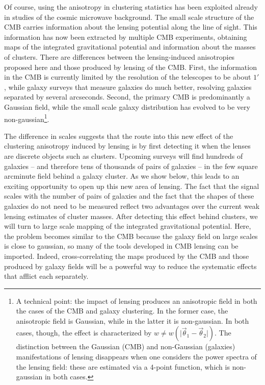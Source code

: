 Of course, using the anisotropy in clustering
statistics has been exploited already in studies of the cosmic
microwave background.  The small scale structure of the CMB carries
information about the lensing potential along the line of sight. This
information has now been extracted by multiple CMB experiments,
obtaining maps of the integrated gravitational potential and
information about the masses of clusters. There are differences
between the lensing-induced anisotropies proposed here and those
produced by lensing of the CMB. First, the information in the CMB is
currently limited by the resolution of the telescopes to be about
$1'$, while galaxy surveys that measure galaxies do much better,
resolving galaxies separated by several arcseconds. Second, the
primary CMB is predominantly a Gaussian field, while the small scale
galaxy distribution has evolved to be very non-gaussian\footnote{A
  technical point: the impact of lensing produces an anisotropic field
  in both the cases of the CMB and galaxy clustering. In the former
  case, the anisotropic field is Gaussian, while in the latter it is
  non-gaussian. In both cases, though, the effect is characterized by
  $w\ne w(\vert\vec\theta_1-\vec\theta_2\vert)$.  The distinction between the Gaussian (CMB) and non-Gaussian (galaxies) manifestations
  of lensing disappears when one considers the power spectra of the
  lensing field: these are estimated via a 4-point function, which is
  non-gaussian in both cases.}.

The difference in scales suggests that the route into this new effect
of the clustering anisotropy induced by lensing is by first detecting
it when the lenses are discrete objects such as clusters. Upcoming
surveys will find hundreds of galaxies -- and therefore tens of
thousands of pairs of galaxies -- in the few square arcminute field
behind a galaxy cluster. As we show below, this leads to an exciting
opportunity to open up this new area of lensing. The fact that the
signal scales with the number of pairs of galaxies and the fact that
the shapes of these galaxies do not need to be measured reflect two
advantages over the current weak lensing estimates of cluster
masses. After detecting this effect behind clusters, we will turn to
large scale mapping of the integrated gravitational potential. Here,
the problem becomes similar to the CMB because the galaxy field on
large scales is close to gaussian, so many of the tools developed in
CMB lensing can be imported. Indeed, cross-correlating the maps
produced by the CMB and those produced by galaxy fields will be a
powerful way to reduce the systematic effects that afflict each
separately.




